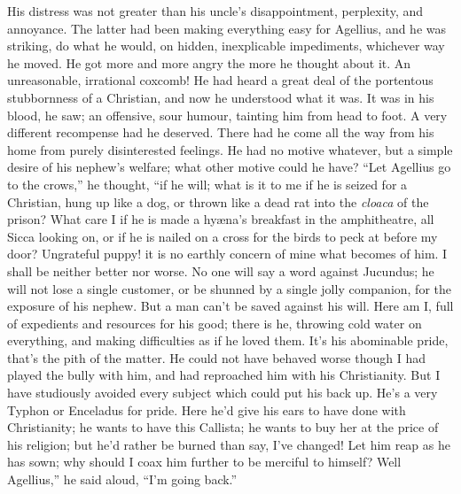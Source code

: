His distress was not greater than his uncle's disappointment,
perplexity, and annoyance. The latter had been making everything easy
for Agellius, and he was striking, do what he would, on hidden,
inexplicable impediments, whichever way he moved. He got more and more
angry the more he thought about it. An unreasonable, irrational
coxcomb! He had heard a great deal of the portentous stubbornness of a
Christian, and now he understood what it was. It was in his blood, he
saw; an offensive, sour humour, tainting him from head to foot. A very
different recompense had he deserved. There had he come all the way
from his home from purely disinterested feelings. He had no motive
whatever, but a simple desire of his nephew's welfare; what other
motive could he have? ``Let Agellius go to the crows,'' he
thought, ``if he will; what is it to me if he is seized for
a Christian, hung up like a dog, or thrown like a dead rat into the \emph{cloaca}
of the prison? What care I if he is made a hyæna's breakfast in the
amphitheatre, all Sicca looking on, or if he is nailed on a cross for
the birds to peck at before my door? Ungrateful puppy! it is no
earthly concern of mine what becomes of him. I shall be neither better
nor worse. No one will say a word against Jucundus; he will not lose a
single customer, or be shunned by a single jolly companion, for the
exposure of his nephew. But a man can't be saved against his will.
Here am I, full of expedients and resources for his good; there is he,
throwing cold water on everything, and making difficulties as if he
loved them. It's his abominable pride, that's the pith of the matter.
He could not have behaved worse though I had played the bully with
him, and had reproached him with his Christianity. But I have
studiously avoided every subject which could put his back up. He's a
very Typhon or Enceladus for pride. Here he'd give his ears to have
done with Christianity; he wants to have this Callista; he wants to
buy her at the price of his religion; but he'd rather be burned than
say, I've changed! Let him reap as he has sown; why should I coax him
further to be merciful to himself? Well Agellius,'' he said aloud,
``I'm going back.''

